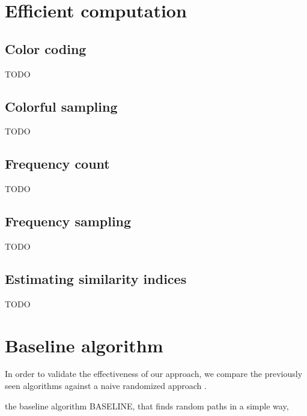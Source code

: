 \clearpage

\section{Efficient computation}


\subsection*{Color coding}

TODO 

\subsection*{Colorful sampling}

TODO 

\subsection*{Frequency count}

TODO 

\subsection*{Frequency sampling}

TODO 

\subsection*{Estimating similarity indices}

TODO 
\clearpage

\section{Baseline algorithm}

In order to validate the effectiveness of our approach, we compare the previously seen algorithms against a naive randomized approach .



 the baseline algorithm BASELINE, 
that finds random paths in a simple way,

